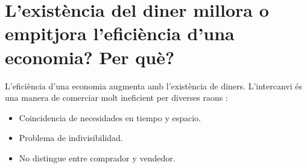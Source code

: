 \section{
L’existència del diner millora o empitjora l’eficiència d’una economia?
Per què?}

L'eficiència d'una economia augmenta amb l'existència de diners. L'intercanvi
és una manera de comerciar molt ineficient per diverses raons
\cite[p.~2]{trans_t_2}:

\begin{itemize}
\item  Coincidencia de necesidades en tiempo y espacio.
\item  Problema de indivisibilidad.
\item  No distingue entre comprador y vendedor.
\end{itemize}
